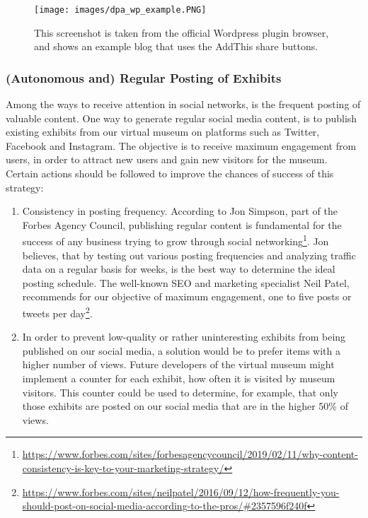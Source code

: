 \begin{figure}[h]
\centering
\texttt{[image: images/dpa\_wp\_example.PNG]}
\caption{This screenshot is taken from the official Wordpress plugin browser, and shows an example blog that uses the AddThis share buttons.}
\label{fig::cl_homepage}
\end{figure}

\subsubsection{(Autonomous and) Regular Posting of Exhibits} \label{socail_regular}

Among the ways to receive attention in social networks, is the frequent posting of valuable content. One way to generate regular social media content, is to publish existing exhibits from our virtual museum on platforms such as Twitter, Facebook and Instagram. The objective is to receive maximum engagement from users, in order to attract new users and gain new visitors for the museum. Certain actions should be followed to improve the chances of success of this strategy:

\begin{enumerate}
    \item Consistency in posting frequency. According to Jon Simpson, part of the Forbes Agency Council, publishing regular content is fundamental for the success of any business trying to grow through social networking\footnote{\url{https://www.forbes.com/sites/forbesagencycouncil/2019/02/11/why-content-consistency-is-key-to-your-marketing-strategy/}}. Jon believes, that by testing out various posting frequencies and analyzing traffic data on a regular basis for weeks, is the best way to determine the ideal posting schedule. The well-known SEO and marketing specialist Neil Patel, recommends for our objective of maximum engagement, one to five posts or tweets per day\footnote{\url{https://www.forbes.com/sites/neilpatel/2016/09/12/how-frequently-you-should-post-on-social-media-according-to-the-pros/#2357596f240f}}.
    \item In order to prevent low-quality or rather uninteresting exhibits from being published on our social media, a solution would be to prefer items with a higher number of views. Future developers of the virtual museum might implement a counter for each exhibit, how often it is visited by museum visitors. This counter could be used to determine, for example, that only those exhibits are posted on our social media that are in the higher 50\% of views.
\end{enumerate}

